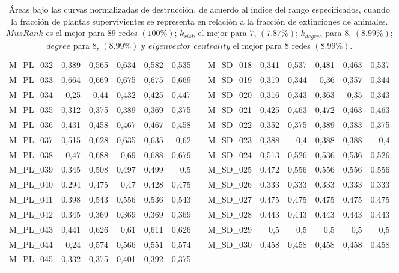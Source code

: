 \begin{table}[hp]
\begin{adjustbox}{angle=90}
\begin{tabular}{lrrrrrrrrrrrr}
    M\_PL\_032 & 0,389 & 0,565 & 0,634 & 0,582 & 0,535 &      & M\_SD\_018 & 0,341 & 0,537 & 0,481 & 0,463 & 0,537 \\
    M\_PL\_033 & 0,664 & 0,669 & 0,675 & 0,675 & 0,669 &      & M\_SD\_019 & 0,319 & 0,344 & 0,36 & 0,357 & 0,344 \\
    M\_PL\_034 & 0,25 & 0,44 & 0,432 & 0,425 & 0,447 &      & M\_SD\_020 & 0,316 & 0,343 & 0,363 & 0,35 & 0,343 \\
    M\_PL\_035 & 0,312 & 0,375 & 0,389 & 0,369 & 0,375 &      & M\_SD\_021 & 0,425 & 0,463 & 0,472 & 0,463 & 0,463 \\
    M\_PL\_036 & 0,431 & 0,458 & 0,467 & 0,467 & 0,458 &      & M\_SD\_022 & 0,352 & 0,375 & 0,389 & 0,383 & 0,375 \\
    M\_PL\_037 & 0,515 & 0,628 & 0,635 & 0,635 & 0,62 &      & M\_SD\_023 & 0,388 & 0,4  & 0,388 & 0,388 & 0,4 \\
    M\_PL\_038 & 0,47 & 0,688 & 0,69 & 0,688 & 0,679 &      & M\_SD\_024 & 0,513 & 0,526 & 0,536 & 0,536 & 0,526 \\
    M\_PL\_039 & 0,345 & 0,508 & 0,497 & 0,499 & 0,5  &      & M\_SD\_025 & 0,472 & 0,556 & 0,556 & 0,556 & 0,556 \\
    M\_PL\_040 & 0,294 & 0,475 & 0,47 & 0,428 & 0,475 &      & M\_SD\_026 & 0,333 & 0,333 & 0,333 & 0,333 & 0,333 \\
    M\_PL\_041 & 0,398 & 0,543 & 0,556 & 0,536 & 0,543 &      & M\_SD\_027 & 0,475 & 0,475 & 0,475 & 0,475 & 0,475 \\
    M\_PL\_042 & 0,345 & 0,369 & 0,369 & 0,369 & 0,369 &      & M\_SD\_028 & 0,443 & 0,443 & 0,443 & 0,443 & 0,443 \\
    M\_PL\_043 & 0,441 & 0,626 & 0,61 & 0,611 & 0,626 &      & M\_SD\_029 & 0,5  & 0,5  & 0,5  & 0,5  & 0,5 \\
    M\_PL\_044 & 0,24 & 0,574 & 0,566 & 0,551 & 0,574 &      & M\_SD\_030 & 0,458 & 0,458 & 0,458 & 0,458 & 0,458 \\
    M\_PL\_045 & 0,332 & 0,375 & 0,401 & 0,392 & 0,375 &      &      &      &      &      &      &  \\
    \bottomrule
    \end{tabular}%
    \end{adjustbox}
    \caption{\label{table:dunne_destruction} Áreas bajo las curvas normalizadas de destrucción, de acuerdo al índice del rango especificados, cuando la fracción de plantas supervivientes se representa en relación a la fracción de extinciones de animales. $MusRank$ es el mejor para $89$ redes $(100\%)$;
$k_{risk}$ el mejor para $7$, $(7.87\%)$; $k_{degree}$ para $8$, $(8.99\%)$; $degree$ para $8$, $(8.99\%)$ y
$eigenvector$ $centrality$ el mejor para $8$ redes $(8.99\%)$.}
\end{table}%


